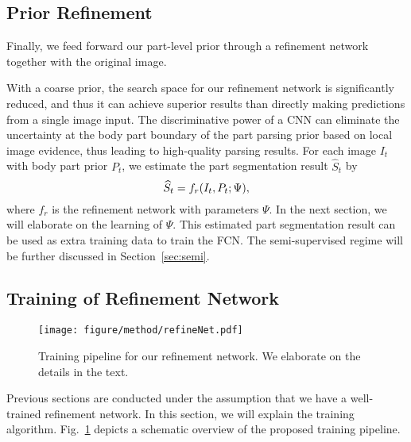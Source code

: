 \documentclass[10pt,twocolumn,letterpaper]{article}
\begin{document}
\subsection{Prior Refinement}
\label{sec:refinement}
Finally, we feed forward our part-level prior through a refinement network together with the original image.

With a coarse prior, the search space for our refinement network is significantly reduced, and thus it can achieve superior results than directly making predictions from a single image input. The discriminative power of a CNN can eliminate the uncertainty at the body part boundary of the part parsing prior based on local image evidence, thus leading to high-quality parsing results. For each image $I_{t}$ with body part prior $P_{t}$, we estimate the part segmentation result $\widehat{S}_{t}$ by
\begin{equation}
\widehat{S}_{t} = f_{r}(I_{t},P_{t};\Psi),
\vspace{-3mm}
\end{equation}
where $f_{r}$ is the refinement network with parameters $\Psi$. In the next section, we will elaborate on the learning of $\Psi$. This estimated part segmentation result can be used as extra training data to train the FCN. The semi-supervised regime will be further discussed in Section~\ref{sec:semi}.

\subsection{Training of Refinement Network}
\label{sec:refineNet}
\begin{figure}[t]
\begin{center}
   \texttt{[image: figure/method/refineNet.pdf]}
\end{center}
\vspace{-3mm}
   \caption{Training pipeline for our refinement network. We elaborate on the details in the text.}
\label{fig:refineNet}
\vspace{-3mm}
\end{figure}
Previous sections are conducted under the assumption that we have a well-trained refinement network. In this section, we will explain the training algorithm. Fig.~\ref{fig:refineNet} depicts a schematic overview of the proposed training pipeline.
\end{document}
